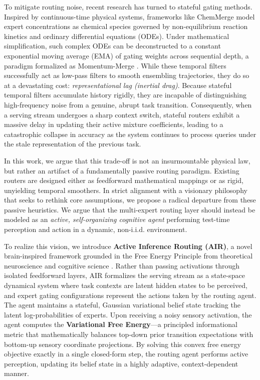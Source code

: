 To mitigate routing noise, recent research has turned to stateful gating methods. Inspired by continuous-time physical systems, frameworks like ChemMerge \cite{chemmerge2025} model expert concentrations as chemical species governed by non-equilibrium reaction kinetics and ordinary differential equations (ODEs). Under mathematical simplification, such complex ODEs can be deconstructed to a constant exponential moving average (EMA) of gating weights across sequential depth, a paradigm formalized as Momentum-Merge \cite{momentummerge2025}. While these temporal filters successfully act as low-pass filters to smooth ensembling trajectories, they do so at a devastating cost: \emph{representational lag (inertial drag)}. Because stateful temporal filters accumulate history rigidly, they are incapable of distinguishing high-frequency noise from a genuine, abrupt task transition. Consequently, when a serving stream undergoes a sharp context switch, stateful routers exhibit a massive delay in updating their active mixture coefficients, leading to a catastrophic collapse in accuracy as the system continues to process queries under the stale representation of the previous task.

In this work, we argue that this trade-off is not an insurmountable physical law, but rather an artifact of a fundamentally passive routing paradigm. Existing routers are designed either as feedforward mathematical mappings or as rigid, unyielding temporal smoothers. In strict alignment with a visionary philosophy that seeks to rethink core assumptions, we propose a radical departure from these passive heuristics. We argue that the multi-expert routing layer should instead be modeled as an \emph{active, self-organizing cognitive agent} performing test-time perception and action in a dynamic, non-i.i.d. environment.

To realize this vision, we introduce \textbf{Active Inference Routing (AIR)}, a novel brain-inspired framework grounded in the Free Energy Principle from theoretical neuroscience and cognitive science \cite{friston2010free, friston2006free}. Rather than passing activations through isolated feedforward layers, AIR formalizes the serving stream as a state-space dynamical system where task contexts are latent hidden states to be perceived, and expert gating configurations represent the actions taken by the routing agent. 
The agent maintains a stateful, Gaussian variational belief state tracking the latent log-probabilities of experts. Upon receiving a noisy sensory activation, the agent computes the \textbf{Variational Free Energy}---a principled informational metric that mathematically balances top-down prior transition expectations with bottom-up sensory coordinate projections. By solving this convex free energy objective exactly in a single closed-form step, the routing agent performs active perception, updating its belief state in a highly adaptive, context-dependent manner.


